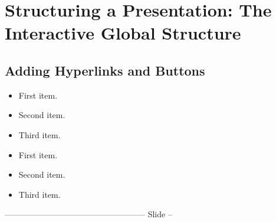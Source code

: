 \section{Structuring a Presentation: The Interactive Global Structure}
\subsection{Adding Hyperlinks and Buttons}
\begin{frame}
  \begin{itemize}
  \item<1-> First item.
  \item<2-> Second item.
  \item<3-> Third item.
  \end{itemize}
  \hyperlink{jumptosecond}{}
  \hypertarget<2>{jumptosecond}{}
\end{frame}
\begin{frame}[label=threeitems]
  \begin{itemize}
  \item<1-> First item.
  \item<2-> Second item.
  \item<3-> Third item.
  \end{itemize}
  \hyperlink{threeitems<2>}{}
\end{frame}
 --------------------------------------------------- Slide --
 \appendix
